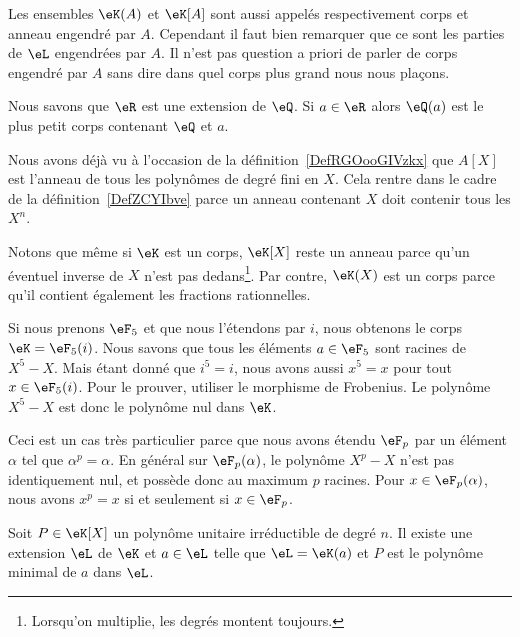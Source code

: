 \begin{remark}
    Les ensembles \( \eK(A)\) et \( \eK[A]\) sont aussi appelés respectivement corps  et anneau engendré par \( A\). Cependant il faut bien remarquer que ce sont les parties de \( \eL\) engendrées par \( A\). Il n'est pas question a priori de parler de corps engendré par \( A\) sans dire dans quel corps plus grand nous nous plaçons.
\end{remark}

\begin{example}
    Nous savons que \( \eR\) est une extension de \( \eQ\). Si \( a\in \eR\) alors \( \eQ(a)\) est le plus petit corps contenant \( \eQ\) et \( a\).
\end{example}

\begin{example}
    Nous avons déjà vu à l'occasion de la définition~\ref{DefRGOooGIVzkx} que \( A[X]\) est l'anneau de tous les polynômes de degré fini en \( X\). Cela rentre dans le cadre de la définition~\ref{DefZCYIbve} parce un anneau contenant \( X\) doit contenir tous les \( X^n\).

    Notons que même si \( \eK\) est un corps, \( \eK[X]\) reste un anneau parce qu'un éventuel inverse de \( X\) n'est pas dedans\footnote{Lorsqu'on multiplie, les degrés montent toujours.}. Par contre, \( \eK(X)\) est un corps parce qu'il contient également les fractions rationnelles.
\end{example}

\begin{example} \label{ExLQhLhJ}
    Si nous prenons \( \eF_5\) et que nous l'étendons par \( i\), nous obtenons le corps \( \eK=\eF_5(i)\). Nous savons que tous les éléments \( a\in \eF_5\) sont racines de \( X^5-X\). Mais étant donné que \( i^5=i\), nous avons aussi \( x^5=x\) pour tout \( x\in \eF_5(i)\). Pour le prouver, utiliser le morphisme de Frobenius. Le polynôme \( X^5-X\) est donc le polynôme nul dans \( \eK\).

    Ceci est un cas très particulier parce que nous avons étendu \( \eF_p\) par un élément \( \alpha\) tel que \( \alpha^p=\alpha\). En général sur \( \eF_p(\alpha)\), le polynôme \( X^p-X\) n'est pas identiquement nul, et possède donc au maximum \( p\) racines. Pour \( x\in \eF_p(\alpha)\), nous avons \( x^p=x\) si et seulement si \( x\in \eF_p\).
\end{example}

\begin{lemma}
    Soit \( P\in\eK[X]\) un polynôme unitaire irréductible de degré \( n\). Il existe une extension \( \eL\) de \( \eK\) et \( a\in \eL\) telle que \( \eL=\eK(a)\) et \( P\) est le polynôme minimal de \( a\) dans \( \eL\).
\end{lemma}

